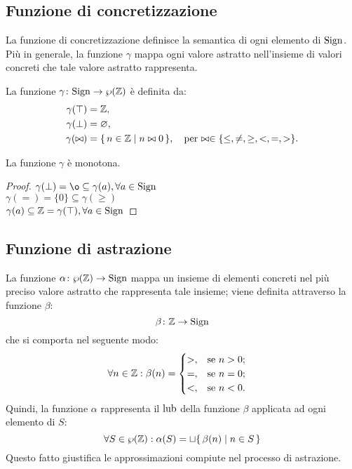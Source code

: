 \subsection{Funzione di concretizzazione}

La funzione di concretizzazione definisce la semantica di ogni
elemento di $\mathrm{Sign}$. Più in generale, la funzione $\gamma$ mappa ogni
valore astratto nell'insieme di valori concreti che tale valore astratto
rappresenta.
\begin{definizione} 
La funzione $\mathord{\gamma}\colon\mathrm{Sign}\to\wp(\mathbb{Z})$ è definita
da:
\begin{align*}
  \gamma(\top) &= \mathbb{Z}, \\
  \gamma(\bot) &= \varnothing, \\
  \gamma(\bowtie) &= \{\, n \in \mathbb{Z} \mid n \bowtie 0 \,\},
    \quad\text{per $\bowtie \in \{ \leq, \neq, \geq, <, =, > \}$.}
\end{align*}
\end{definizione}

\begin{proposizione}
La funzione $\gamma$ è monotona.
\end{proposizione}
\begin{proof}
        $ \gamma(\bot) = \o \subseteq \gamma(a) , \forall a \in \Sign $ \\
        $ \gamma(=) = \{0\} \subseteq \gamma(\geq) $ \\
        $ \gamma(a) \subseteq \mathbb{Z} = \gamma(\top), \forall a \in \mathrm{Sign} $
\end{proof}

\subsection{Funzione di astrazione}

\begin{definizione} 
La funzione $\mathord{\alpha}\colon\wp(\mathbb{Z})\to\mathrm{Sign}$ mappa un insieme
di elementi concreti nel più preciso valore astratto che rappresenta
tale insieme; viene definita attraverso la funzione $\beta$:
\[
        \mathord{\beta}\colon\mathbb{Z}\to\mathrm{Sign}
\]
che si comporta nel seguente modo:
\begin{align*}
        \forall n \in \mathbb{Z} \mathrel{:} \beta(n) &=
        \begin{cases}
                >,      &\text{se $n  >  0$;} \\
                =,      &\text{se $n = 0$;} \\
                <,      &\text{se $n < 0$.}
        \end{cases} 
\end{align*}
Quindi, la funzione $\alpha$ rappresenta il $\mathop{\mathrm{lub}}\nolimits$ della
funzione $\beta$ applicata ad ogni elemento di $S$:
\[
        \forall S \in \wp(\mathbb{Z}) \mathrel{:} \alpha(S) = \sqcup \{\, \beta(n) \mid n \in S \,\}
\]
Questo fatto giustifica le approssimazioni compiute nel processo
di astrazione.
\end{definizione}

